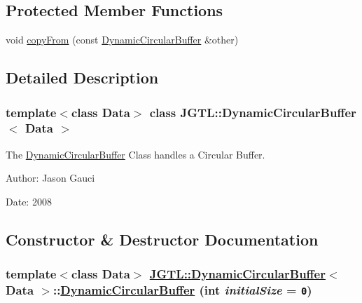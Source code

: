 \subsection*{Protected Member Functions}
\begin{CompactItemize}
\item 
void \hyperlink{class_j_g_t_l_1_1_dynamic_circular_buffer_5a81d3d91868e9c3ab1816583444984f}{copy\-From} (const \hyperlink{class_j_g_t_l_1_1_dynamic_circular_buffer}{Dynamic\-Circular\-Buffer} \&other)
\end{CompactItemize}


\subsection{Detailed Description}
\subsubsection*{template$<$class Data$>$ class JGTL::Dynamic\-Circular\-Buffer$<$ Data $>$}

The \hyperlink{class_j_g_t_l_1_1_dynamic_circular_buffer}{Dynamic\-Circular\-Buffer} Class handles a Circular Buffer. 

\begin{Desc}
\item[Author:]Jason Gauci \end{Desc}
\begin{Desc}
\item[Date:]2008 \end{Desc}




\subsection{Constructor \& Destructor Documentation}
\hypertarget{class_j_g_t_l_1_1_dynamic_circular_buffer_32e925536e7628b1e5a088300def83a5}{
\subsubsection[DynamicCircularBuffer]{\setlength{\rightskip}{0pt plus 5cm}template$<$class Data$>$ \hyperlink{class_j_g_t_l_1_1_dynamic_circular_buffer}{JGTL::Dynamic\-Circular\-Buffer}$<$ Data $>$::\hyperlink{class_j_g_t_l_1_1_dynamic_circular_buffer}{Dynamic\-Circular\-Buffer} (int {\em initial\-Size} = {\tt 0})}}
\label{class_j_g_t_l_1_1_dynamic_circular_buffer_32e925536e7628b1e5a088300def83a5}


